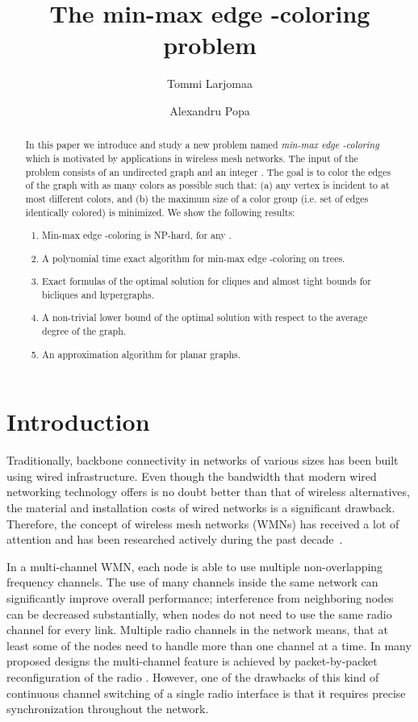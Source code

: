 \documentclass[runningheads, a4paper]{llncs}
\title{The min-max edge -coloring problem}
\author{Tommi Larjomaa \and Alexandru Popa}
\institute{
Department of Communications \& Networking, Aalto University School of Electrical Engineering, Aalto, Finland. \\ E-mails: \email{\{tommi.larjomaa@aalto.fi, alexandru.popa@aalto.fi\}}
}
\begin{document}
\maketitle
\begin{abstract}
In this paper we introduce and study a new problem named \emph{min-max edge -coloring} which is motivated by applications in wireless mesh networks. The input of the problem consists of an undirected graph and an integer . The goal is to color the edges of the graph with as many colors as possible such that: (a) any vertex is incident to at most  different colors, and (b) the maximum size of a color group (i.e. set of edges identically colored) is minimized. We show the following results:
\begin{enumerate}
\item Min-max edge -coloring is NP-hard, for any .
\item A polynomial time exact algorithm for min-max edge -coloring on trees.
\item Exact formulas of the optimal solution for cliques and almost tight bounds for bicliques and hypergraphs. 
\item A non-trivial lower bound of the optimal solution with respect to the average degree of the graph.
\item An approximation algorithm for planar graphs.
\end{enumerate}
\end{abstract}

\section{Introduction}



Traditionally, backbone connectivity in networks of various sizes has been built using wired infrastructure. Even though the bandwidth that modern wired networking technology offers is no doubt better than that of wireless alternatives, the material and installation costs of wired networks is a significant drawback. Therefore, the concept of wireless mesh networks (WMNs) has received a lot of attention and has been researched actively during the past decade~\cite{Akyildiz2005445,Wang2008,draves2004,gupta2009,koksal2006}.


In a multi-channel WMN, each node is able to use multiple non-overlapping frequency channels. The use of many channels inside the same network can significantly improve overall performance; interference from neighboring nodes can be decreased substantially, when nodes do not need to use the same radio channel for every link. Multiple radio channels in the network means, that at least some of the nodes need to handle more than one channel at a time. In many proposed designs the multi-channel feature is achieved by packet-by-packet reconfiguration of the radio \cite{muir1998,kyasanur2005,so2004}. However, one of the drawbacks of this kind of continuous channel switching of a single radio interface is that it requires precise synchronization throughout the network.
\end{document}
